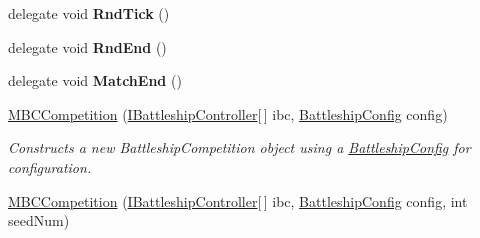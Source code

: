 \begin{DoxyCompactItemize}
\item 
\hypertarget{class_m_b_c_1_1_core_1_1_m_b_c_competition_a9f3ddebeeb4484563a9217cd863da0c3}{delegate void {\bfseries Rnd\-Tick} ()}\label{class_m_b_c_1_1_core_1_1_m_b_c_competition_a9f3ddebeeb4484563a9217cd863da0c3}

\item 
\hypertarget{class_m_b_c_1_1_core_1_1_m_b_c_competition_a62071d08bfe3b8d66481d4999f78524d}{delegate void {\bfseries Rnd\-End} ()}\label{class_m_b_c_1_1_core_1_1_m_b_c_competition_a62071d08bfe3b8d66481d4999f78524d}

\item 
\hypertarget{class_m_b_c_1_1_core_1_1_m_b_c_competition_ad28a85f6882fc2a43dd0e77b22490545}{delegate void {\bfseries Match\-End} ()}\label{class_m_b_c_1_1_core_1_1_m_b_c_competition_ad28a85f6882fc2a43dd0e77b22490545}

\item 
\hypertarget{class_m_b_c_1_1_core_1_1_m_b_c_competition_a87cf7a27dfc155cbdcf3971e257f93fe}{\hyperlink{class_m_b_c_1_1_core_1_1_m_b_c_competition_a87cf7a27dfc155cbdcf3971e257f93fe}{M\-B\-C\-Competition} (\hyperlink{interface_m_b_c_1_1_core_1_1_i_battleship_controller}{I\-Battleship\-Controller}\mbox{[}$\,$\mbox{]} ibc, \hyperlink{class_m_b_c_1_1_core_1_1_battleship_config}{Battleship\-Config} config)}\label{class_m_b_c_1_1_core_1_1_m_b_c_competition_a87cf7a27dfc155cbdcf3971e257f93fe}

\begin{DoxyCompactList}\small\item\em Constructs a new Battleship\-Competition object using a \hyperlink{class_m_b_c_1_1_core_1_1_battleship_config}{Battleship\-Config} for configuration.\end{DoxyCompactList}\item 
\hypertarget{class_m_b_c_1_1_core_1_1_m_b_c_competition_a681b10462642ffbfb6fa62d43f409343}{\hyperlink{class_m_b_c_1_1_core_1_1_m_b_c_competition_a681b10462642ffbfb6fa62d43f409343}{M\-B\-C\-Competition} (\hyperlink{interface_m_b_c_1_1_core_1_1_i_battleship_controller}{I\-Battleship\-Controller}\mbox{[}$\,$\mbox{]} ibc, \hyperlink{class_m_b_c_1_1_core_1_1_battleship_config}{Battleship\-Config} config, int seed\-Num)}\label{class_m_b_c_1_1_core_1_1_m_b_c_competition_a681b10462642ffbfb6fa62d43f409343}


\end{DoxyCompactItemize}

